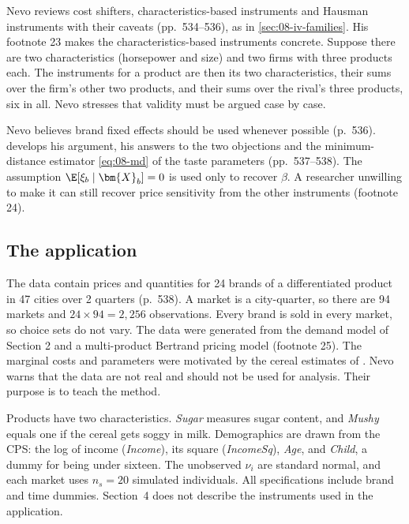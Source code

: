 Nevo reviews cost shifters, characteristics-based instruments and Hausman instruments with their caveats
(pp.~534--536), as in \cref{sec:08-iv-families}. His footnote 23 makes the characteristics-based instruments
concrete. Suppose there are two characteristics (horsepower and size) and two firms with three products each.
The instruments for a product are then its two characteristics, their sums over the firm's other two products,
and their sums over the rival's three products, six in all. Nevo stresses that validity must be argued case by
case.

Nevo believes brand fixed effects should be used whenever possible (p.~536).  develops his
argument, his answers to the two objections and the minimum-distance estimator \eqref{eq:08-md} of the taste
parameters (pp.~537--538). The assumption $\E[\xi_b\mid \bm{X}_b]=0$ is used only to recover $\beta$. A
researcher unwilling to make it can still recover price sensitivity from the other instruments (footnote 24).

\subsection{The application}\label{sec:08-nevo00-app}

The data contain prices and quantities for 24 brands of a differentiated product in 47 cities over 2
quarters (p.~538). A market is a city-quarter, so there are 94 markets and $24\times94=2{,}256$
observations. Every brand is sold in every market, so choice sets do not vary. The data were generated
from the demand model of Section 2 and a multi-product Bertrand pricing model (footnote 25). The marginal
costs and parameters were motivated by the cereal estimates of \citet{Nevo2000b}. Nevo warns that the data
are not real and should not be used for analysis. Their purpose is to teach the method.

Products have two characteristics. \emph{Sugar} measures sugar content, and \emph{Mushy} equals one if
the cereal gets soggy in milk. Demographics are drawn from the CPS: the log of income (\emph{Income}), its
square (\emph{IncomeSq}), \emph{Age}, and \emph{Child}, a dummy for being under sixteen. The unobserved
$\nu_i$ are standard normal, and each market uses $n_s=20$ simulated individuals. All specifications
include brand and time dummies. Section~4 does not describe the instruments used in the application.

